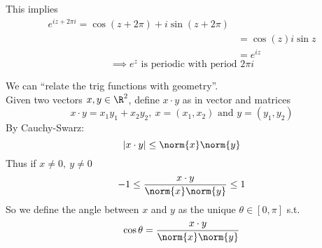\begin{note}
This implies
\begin{align*}
    e^{iz+2\pi i} = \cos(z+2\pi) + i\sin(z+2\pi)\\
    &=\cos(z)  i\sin z\\
    &=e^{iz}
\end{align*}
\[\implies e^{z} \text{ is periodic with period }2\pi i \]
\end{note}
\begin{remark}
We can ``relate the trig functions with geometry''.\\
Given two vectors $x,y\in \R^2$, define
$x\cdot y$ as in vector and matrices
\[x\cdot y = x_1y_1 + x_2y_2, \ x = (x_1,x_2)\text{ and }y = (y_1,y_2)\]
By Cauchy-Swarz:
\[|x\cdot y|\leq \norm{x}\norm{y}\]
Thus if $x\neq 0,\ y\neq 0$
\[-1\leq\frac{x\cdot y}{\norm{x}\norm{y}}\leq 1\]
So we define the angle between $x$ and $y$ as the unique $\theta \in [0,\pi]$ s.t.
\[\cos\theta = \frac{x\cdot y}{\norm{x}\norm{y}}\]



\begin{tikzpicture}[x=0.75pt,y=0.75pt,yscale=-1,xscale=1]


\end{tikzpicture}
\end{remark}
